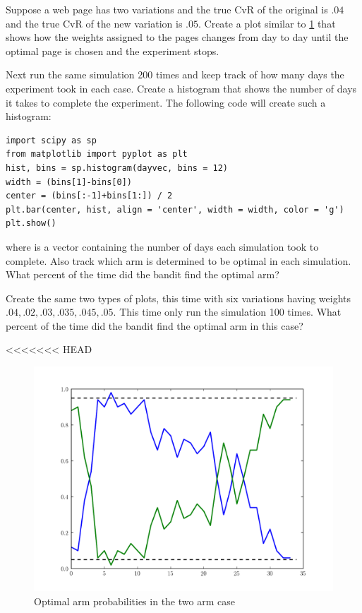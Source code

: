 \begin{problem}
Suppose a web page has two variations and the true CvR of the original is 
$.04$ and the true CvR of the new variation is $.05$. 
Create a plot similar to \ref{fig:weights1} that shows how the weights 
assigned to the pages changes from day to day until the optimal page is chosen and the experiment stops.

Next run the same simulation 200 times and keep track of how many days 
the experiment took in each case.  Create a histogram that shows the 
number of days it takes to complete the experiment.  
The following code will create such a histogram:
\begin{lstlisting}
import scipy as sp
from matplotlib import pyplot as plt
hist, bins = sp.histogram(dayvec, bins = 12)
width = (bins[1]-bins[0])
center = (bins[:-1]+bins[1:]) / 2
plt.bar(center, hist, align = 'center', width = width, color = 'g')
plt.show()
\end{lstlisting}
where  is a vector containing the number of days each simulation took to complete. 
Also track which arm is determined to be optimal in each simulation.  
What percent of the time did the bandit find the optimal arm?

Create the same two types of plots, this time with six variations having 
weights $.04,.02,.03,.035,.045,.05$.  This time only run the simulation 100 times.  
What percent of the time did the bandit find the optimal arm in this case?
\end{problem}

<<<<<<< HEAD
\begin{figure}
\begin{center}
        \includegraphics[width=\textwidth]{./Applications/MarkDecProc/weights1.pdf}
        \caption{Optimal arm probabilities in the two arm case}
				\label{fig:weights1}
\end{center}
\end{figure}


